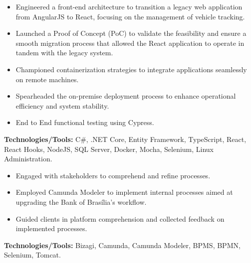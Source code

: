 \documentclass[10pt,a4paper]{altacv}
\begin{document}
\begin{itemize}
    \setlength{\itemindent}{0.5em}
    \item[--] Engineered a front-end architecture to transition a legacy web application from AngularJS to React, focusing on the management of vehicle tracking.
    \item[--] Launched a Proof of Concept (PoC) to validate the feasibility and ensure a smooth migration process that allowed the React application to operate in tandem with the legacy system.
    \item[--] Championed containerization strategies to integrate applications seamlessly on remote machines.
    \item[--] Spearheaded the on-premise deployment process to enhance operational efficiency and system stability.
    \item[--] End to End functional testing using Cypress.
\end{itemize}
\textbf{Technologies/Tools:} C\#, .NET Core, Entity Framework, TypeScript, React, React Hooks, NodeJS, SQL Server, Docker, Mocha, Selenium, Linux Administration.
\vspace{5mm}


\begin{itemize}
    \setlength{\itemindent}{0.5em}
    \item[--] Engaged with stakeholders to comprehend and refine processes.   
    \item[--] Employed Camunda Modeler to implement internal processes aimed at upgrading the Bank of Brasília's workflow.    
    \item[--] Guided clients in platform comprehension and collected feedback on implemented processes.
\end{itemize}
\textbf{Technologies/Tools:} Bizagi, Camunda, Camunda Modeler, BPMS, BPMN, Selenium, Tomcat.
\vspace{5mm}
\end{document}

